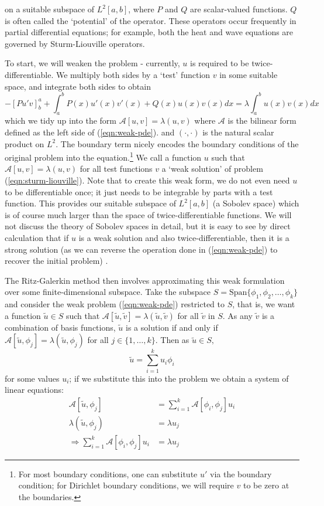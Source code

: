 \documentclass[../main.tex]{subfiles}
\begin{document}
on a suitable subspace of $L^2[a, b]$, where $P$ and $Q$ are scalar-valued functions. $Q$ is often called the `potential' of the operator. These operators occur frequently in partial differential equations; for example, both the heat and wave equations are governed by Sturm-Liouville operators.

To start, we will weaken the problem - currently, $u$ is required to be twice-differentiable. We multiply both sides by a `test' function $v$ in some suitable
space, and integrate both sides to obtain
\begin{equation}\label{eqn:weak-pde}
-[Pu'v]^a_b + \int_a^b P(x) u'(x) v'(x) + Q(x) u(x) v(x) dx = \lambda \int_a^b u(x) v(x) dx
\end{equation}
which we tidy up into the form $\mathcal{A}[u, v] = \lambda (u, v)$ where $\mathcal{A}$ is the bilinear form defined as the left side of (\ref{eqn:weak-pde}). and $(\cdot, \cdot)$ is the natural scalar product on $L^2$. The boundary term nicely encodes the boundary conditions of the original problem
into the equation.\footnote{For most boundary conditions, one can substitute $u'$ via the boundary condition; for Dirichlet boundary conditions, we will require $v$ to be zero at the boundaries.}
We call a function $u$ such that $\mathcal{A}[u, v] = \lambda (u, v)$ for all test functions $v$ a `weak solution' of problem (\ref{eqn:sturm-liouville}).
Note that to create this weak form, we do not even need $u$ to be differentiable once; it just needs to
be integrable by parts with a test function. This provides our suitable subspace of $L^2[a, b]$ (a Sobolev space) which is of course much larger than the space of twice-differentiable functions. We will not discuss the theory of Sobolev spaces in detail, but it is easy to see by direct calculation that if $u$ is a weak solution and also twice-differentiable, then it
is a strong solution (as we can reverse the operation done in (\ref{eqn:weak-pde}) to recover the initial problem) \cite{brezis2011functional}.

The Ritz-Galerkin method then involves approximating this weak formulation over some finite-dimensional subspace. Take the subspace $S = \text{Span}\{\phi_1, \phi_2, \hdots, \phi_k\}$ and consider the weak problem (\ref{eqn:weak-pde}) restricted to $S$, that is, we want a function $\tilde{u} \in S$ such that 
$\mathcal{A}[\tilde{u}, \tilde{v}] = \lambda (\tilde{u}, \tilde{v})$ for all $\tilde{v}$ in $S$. As any $\tilde{v}$ is a combination
of basis functions, $\tilde{u}$ is a solution if and only if $\mathcal{A}[\tilde{u}, \phi_j] = \lambda (\tilde{u}, \phi_j)$ for all $j \in \{1, \hdots, k\}$. Then as $\tilde{u} \in S,$
$$\tilde{u} = \sum_{i=1}^k u_i \phi_i$$
for some values $u_i$; if we substitute this into the problem we obtain a system of linear equations:
\begin{align*}
\mathcal{A}[\tilde{u}, \phi_j] & = \sum_{i=1}^k \mathcal{A}[\phi_i, \phi_j] u_i \\
\lambda (\tilde{u}, \phi_j) & = \lambda u_j \\
\Rightarrow \sum_{i=1}^k \mathcal{A}[\phi_i, \phi_j] u_i & = \lambda u_j
\end{align*}
\end{document}
